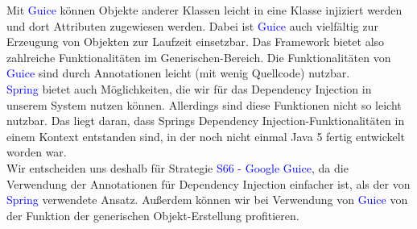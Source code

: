 \documentclass[enabledeprecatedfontcommands,fontsize=11pt,paper=a4,twoside]{scrartcl}
\newcounter{one}
\newcommand{\cb}[1]{{\textcolor{blue}{#1}}}
\begin{document}
	\begin{onehalfspace}
		Mit \cb{Guice} können Objekte anderer Klassen leicht in eine Klasse injiziert werden und dort Attributen zugewiesen werden. Dabei ist \cb{Guice} auch vielfältig zur Erzeugung von Objekten zur Laufzeit einsetzbar. Das Framework bietet also zahlreiche Funktionalitäten im Generischen-Bereich. Die Funktionalitäten von \cb{Guice} sind durch Annotationen leicht (mit wenig Quellcode) nutzbar. \\
		\cb{Spring} bietet auch Möglichkeiten, die wir für das Dependency Injection in unserem System nutzen können. Allerdings sind diese Funktionen nicht so leicht nutzbar. Das liegt daran, dass Springs Dependency Injection-Funktionalitäten in einem Kontext entstanden sind, in der noch nicht einmal Java 5 fertig entwickelt worden war. \\
		Wir entscheiden uns deshalb für Strategie \cb{S66 - Google Guice}, da die Verwendung der Annotationen für Dependency Injection einfacher ist, als der von \cb{Spring} verwendete Ansatz. Außerdem können wir bei Verwendung von \cb{Guice} von der Funktion der generischen Objekt-Erstellung profitieren.
	\end{onehalfspace}
	\newpage
\end{document}
